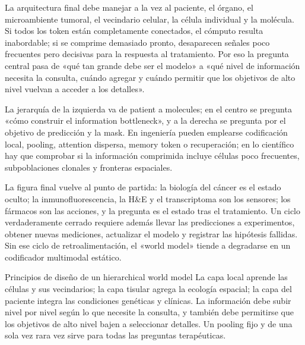 La arquitectura final debe manejar a la vez al paciente, el órgano, el microambiente tumoral, el vecindario celular, la célula individual y la molécula. Si todos los token están completamente conectados, el cómputo resulta inabordable; si se comprime demasiado pronto, desaparecen señales poco frecuentes pero decisivas para la respuesta al tratamiento. Por eso la pregunta central pasa de «qué tan grande debe ser el modelo» a «qué nivel de información necesita la consulta, cuándo agregar y cuándo permitir que los objetivos de alto nivel vuelvan a acceder a los detalles».


La jerarquía de la izquierda va de patient a molecules; en el centro se pregunta «cómo construir el information bottleneck», y a la derecha se pregunta por el objetivo de predicción y la mask. En ingeniería pueden emplearse codificación local, pooling, attention dispersa, memory token o recuperación; en lo científico hay que comprobar si la información comprimida incluye células poco frecuentes, subpoblaciones clonales y fronteras espaciales.


La figura final vuelve al punto de partida: la biología del cáncer es el estado oculto; la inmunofluorescencia, la H\&E y el transcriptoma son los sensores; los fármacos son las acciones, y la pregunta es el estado tras el tratamiento. Un ciclo verdaderamente cerrado requiere además llevar las predicciones a experimentos, obtener nuevas mediciones, actualizar el modelo y registrar las hipótesis fallidas. Sin ese ciclo de retroalimentación, el «world model» tiende a degradarse en un codificador multimodal estático.


\begin{importantbox}{Principios de diseño de un hierarchical world model}
La capa local aprende las células y sus vecindarios; la capa tisular agrega la ecología espacial; la capa del paciente integra las condiciones genéticas y clínicas. La información debe subir nivel por nivel según lo que necesite la consulta, y también debe permitirse que los objetivos de alto nivel bajen a seleccionar detalles. Un pooling fijo y de una sola vez rara vez sirve para todas las preguntas terapéuticas.
\end{importantbox}

